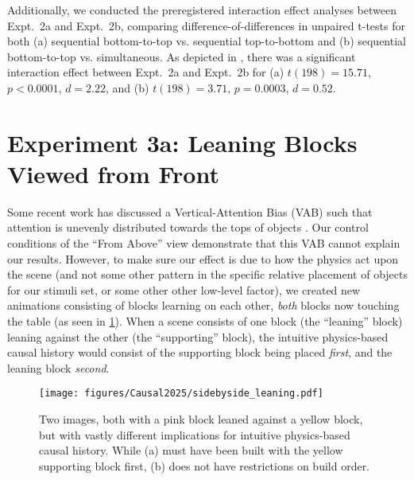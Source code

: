 Additionally, we conducted the preregistered interaction effect analyses between Expt.~2a and Expt.~2b, comparing difference-of-differences in unpaired t-tests for both (a) sequential bottom-to-top vs. sequential top-to-bottom and (b) sequential bottom-to-top vs. simultaneous.  As depicted in , there was a significant interaction effect between Expt.~2a and Expt.~2b for (a) $t(198) = 15.71$, $p < 0.0001$, $d = 2.22$, and (b) $t(198) = 3.71$, $p = 0.0003$, $d = 0.52$.

\section{Experiment 3a: Leaning Blocks Viewed from Front}
Some recent work has discussed a Vertical-Attention Bias (VAB) such that attention is unevenly distributed towards the tops of objects \parencite{langley_vertical_2023, langley_children_2023}.  Our control conditions of the “From Above” view demonstrate that this VAB cannot explain our results.  However, to make sure our effect is due to how the physics act upon the scene (and not some other pattern in the specific relative placement of objects for our stimuli set, or some other other low-level factor), we created new animations consisting of blocks learning on each other, \textit{both} blocks now touching the table (as seen in \cref{fig:CausalHist_5}).  When a scene consists of one block (the “leaning” block) leaning against the other (the “supporting” block), the intuitive physics-based causal history would consist of the supporting block being placed \textit{first}, and the leaning block \textit{second}.
\begin{figure}
    \centering
    \texttt{[image: figures/Causal2025/sidebyside\_leaning.pdf]}
    \caption
    {Two images, both with a pink block leaned against a yellow block, but with vastly different implications for intuitive physics-based causal history.  While (a) must have been built with the yellow supporting block first, (b) does not have restrictions on build order.}
    \label{fig:CausalHist_5}
\end{figure}
